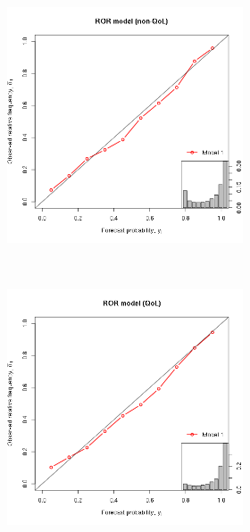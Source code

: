 \begin{figure}[h]
  \centering
    \begin{subfigure}[p!]{\textwidth}
    \caption{ROR Modeling using GLM}
        \begin{subfigure}[p1]{0.49\textwidth}
            \includegraphics[width=\textwidth]{figures/glmplots/ror_fc.png}
        \end{subfigure}
        ~
        \begin{subfigure}[p1]{0.49\textwidth}
            \includegraphics[width=\textwidth]{figures/glmplots/rorq_fc.png}
        \end{subfigure}
    \end{subfigure}



\end{figure}
